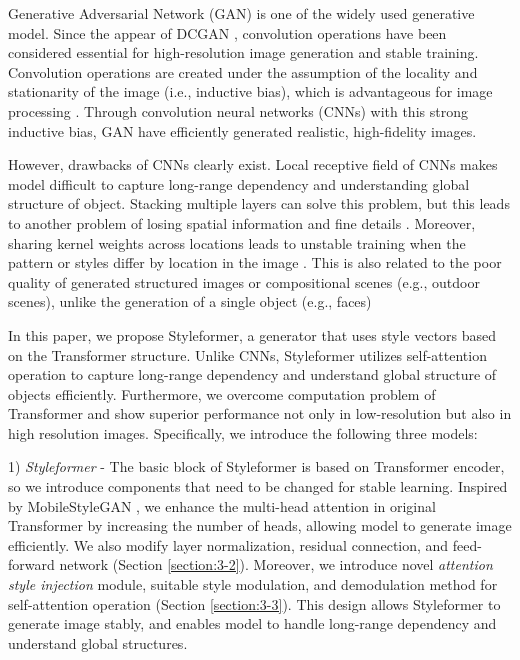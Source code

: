 \documentclass[10pt,twocolumn,letterpaper]{article}
\begin{document}
Generative Adversarial Network (GAN) \cite{goodfellow2014generative} is one of the widely used generative model. Since the appear of DCGAN \cite{radford2016unsupervised}, convolution operations have been considered essential for high-resolution image generation and stable training. Convolution operations are created under the assumption of the locality and stationarity of the image (i.e., inductive bias), which is advantageous for image processing \cite{NIPS2012_c399862d}. 
Through convolution neural networks (CNNs) with this strong inductive bias, GAN have efficiently generated realistic, high-fidelity images.

However, drawbacks of CNNs clearly exist. 
 Local receptive field of CNNs makes model difficult to capture long-range dependency and understanding global structure of object. Stacking multiple layers can solve this problem, but this leads to another problem of losing spatial information and fine details \cite{yu2018generative}. Moreover, sharing kernel weights across locations leads to unstable training when the pattern or styles differ by location in the image \cite{zhang2019selfattention}. 
This is also related to the poor quality of generated structured images or compositional scenes (e.g., outdoor scenes), unlike the generation of a single object (e.g., faces)



In this paper, we propose Styleformer, a generator that uses style vectors based on the Transformer structure. Unlike CNNs, Styleformer utilizes self-attention operation to capture long-range dependency and understand global structure of objects efficiently. Furthermore, we overcome computation problem of Transformer and show superior performance not only in low-resolution but also in high resolution images. Specifically, we introduce the following three models:

1) \textit{Styleformer} - The basic block of Styleformer is based on Transformer encoder, so we introduce components that need to be changed for stable learning. Inspired by MobileStyleGAN \cite{belousov2021mobilestylegan}, we enhance the multi-head attention in original Transformer by increasing the number of heads, allowing model to generate image efficiently. We also modify layer normalization, residual connection, and feed-forward network (Section \ref{section:3-2}). Moreover, we introduce novel \textit{attention style injection} module, suitable style modulation, and demodulation method for self-attention operation (Section \ref{section:3-3}). This design allows Styleformer to generate image stably, and enables model to handle long-range dependency and understand global structures.
\end{document}
